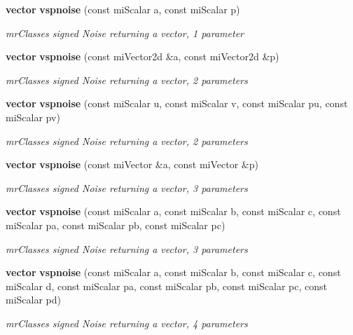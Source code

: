 \begin{CompactItemize}
{\bf vector} {\bf vspnoise} (const mi\-Scalar a, const mi\-Scalar p)
\begin{CompactList}\small\item\em mr\-Classes signed Noise returning a vector, 1 parameter \item\end{CompactList}\item 
{\bf vector} {\bf vspnoise} (const mi\-Vector2d \&a, const mi\-Vector2d \&p)
\begin{CompactList}\small\item\em mr\-Classes signed Noise returning a vector, 2 parameters \item\end{CompactList}\item 
{\bf vector} {\bf vspnoise} (const mi\-Scalar u, const mi\-Scalar v, const mi\-Scalar pu, const mi\-Scalar pv)
\begin{CompactList}\small\item\em mr\-Classes signed Noise returning a vector, 2 parameters \item\end{CompactList}\item 
{\bf vector} {\bf vspnoise} (const mi\-Vector \&a, const mi\-Vector \&p)
\begin{CompactList}\small\item\em mr\-Classes signed Noise returning a vector, 3 parameters \item\end{CompactList}\item 
{\bf vector} {\bf vspnoise} (const mi\-Scalar a, const mi\-Scalar b, const mi\-Scalar c, const mi\-Scalar pa, const mi\-Scalar pb, const mi\-Scalar pc)
\begin{CompactList}\small\item\em mr\-Classes signed Noise returning a vector, 3 parameters \item\end{CompactList}\item 
{\bf vector} {\bf vspnoise} (const mi\-Scalar a, const mi\-Scalar b, const mi\-Scalar c, const mi\-Scalar d, const mi\-Scalar pa, const mi\-Scalar pb, const mi\-Scalar pc, const mi\-Scalar pd)
\begin{CompactList}\small\item\em mr\-Classes signed Noise returning a vector, 4 parameters \item\end{CompactList}\item 

\end{CompactItemize}
